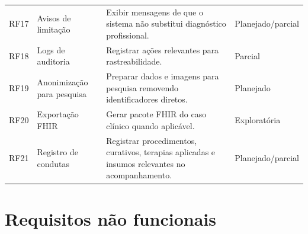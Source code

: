 \documentclass[
    12pt,
    oneside,
    a4paper,
    chapter=TITLE,
    brazil,
    sumario=tradicional,
    hidelinks
]{abntex2}
\begin{document}
\begin{longtable}{L{1.6cm}L{3.2cm}L{6.6cm}L{2.4cm}}
RF17 & Avisos de limitação & Exibir mensagens de que o sistema não substitui diagnóstico profissional. & Planejado/parcial \\
RF18 & Logs de auditoria & Registrar ações relevantes para rastreabilidade. & Parcial \\
RF19 & Anonimização para pesquisa & Preparar dados e imagens para pesquisa removendo identificadores diretos. & Planejado \\
RF20 & Exportação FHIR & Gerar pacote FHIR do caso clínico quando aplicável. & Exploratória \\
RF21 & Registro de condutas & Registrar procedimentos, curativos, terapias aplicadas e insumos relevantes no acompanhamento. & Planejado/parcial \\
\bottomrule
\end{longtable}

\chapter{Requisitos não funcionais}
\end{document}
